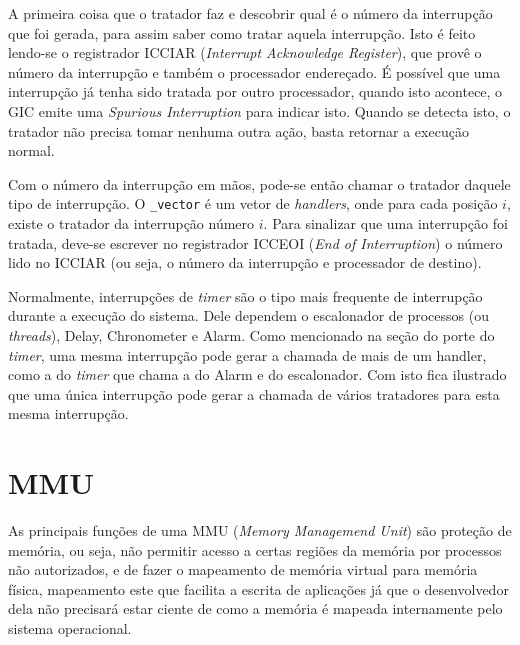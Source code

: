 A primeira coisa que o tratador faz e descobrir qual é o número da interrupção que foi gerada, para assim saber como tratar aquela interrupção. Isto é feito lendo-se o registrador ICCIAR (\emph{Interrupt Acknowledge Register}), que provê o número da interrupção e também o processador endereçado.
É possível que uma interrupção já tenha sido tratada por outro processador, quando isto acontece, o GIC emite uma \emph{Spurious Interruption} para indicar isto. Quando se detecta isto, o tratador não precisa tomar nenhuma outra ação, basta retornar a execução normal.

Com o número da interrupção em mãos, pode-se então chamar o tratador daquele tipo de interrupção. O \verb+_vector+ é um vetor de \emph{handlers}, onde para cada posição $i$, existe o tratador da interrupção número $i$. Para sinalizar que uma interrupção foi tratada, deve-se escrever no registrador ICCEOI (\emph{End of Interruption}) o número lido no ICCIAR (ou seja, o número da interrupção e processador de destino).


Normalmente, interrupções de \emph{timer} são o tipo mais frequente de interrupção durante a execução do sistema. Dele dependem o escalonador de processos (ou \emph{threads}), Delay, Chronometer e Alarm. Como mencionado na seção do porte do \emph{timer}, uma mesma interrupção pode gerar a chamada de mais de um handler, como a do \emph{timer} que chama a do Alarm e do escalonador. Com isto fica ilustrado que uma única interrupção pode gerar a chamada de vários tratadores para esta mesma interrupção.


\section{MMU}
\label{sec:mmu}




As principais funções de uma MMU (\emph{Memory Managemend Unit}) são proteção de memória, ou seja, não permitir acesso a certas regiões da memória por processos não autorizados, e de fazer o mapeamento de memória virtual para memória física, mapeamento este que facilita a escrita de aplicações já que o desenvolvedor dela não precisará estar ciente de como a memória é mapeada internamente pelo sistema operacional.

